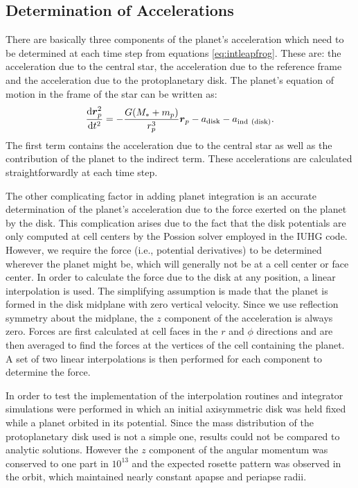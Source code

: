 \subsection{Determination of Accelerations}\label{sec:planetforces}

There are basically three components of the planet's acceleration which need to be determined at each time step from equations \eqref{eq:intleapfrog}. These are: the acceleration due to the central star, the acceleration due to the reference frame and the acceleration due to the protoplanetary disk. The planet's equation of motion in the frame of the star can be written as:
\begin{equation}
\frac{\mathrm{d} \boldsymbol{r}^2_p}{\mathrm{d} t^2} = -\frac{G(M_\ast + m_p)}{r^3_p}\boldsymbol{r}_p - a_{\mathrm{disk}} - a_{\mathrm{ind~(disk)}}.
\end{equation}
The first term contains the acceleration due to the central star as well as the contribution of the planet to the indirect term. These accelerations are calculated straightforwardly at each time step.

The other complicating factor in adding planet integration is an accurate determination of the planet's acceleration due to the force exerted on the planet by the disk. This complication arises due to the fact that the disk potentials are only computed at cell centers by the Possion solver employed in the IUHG code. However, we require the force (i.e., potential derivatives) to be determined wherever the planet might be, which will generally not be at a cell center or face center. In order to calculate the force due to the disk at any position, a linear interpolation is used. The simplifying assumption is made that the planet is formed in the disk midplane with zero vertical velocity. Since we use reflection symmetry about the midplane, the $z$ component of the acceleration is always zero. Forces are first calculated at cell faces in the $r$ and $\phi$ directions and are then averaged to find the forces at the vertices of the cell containing the planet. A set of two linear interpolations is then performed for each component to determine the force. 

In order to test the implementation of the interpolation routines and integrator simulations were performed in which an initial axisymmetric disk was held fixed while a planet orbited in its potential. Since the mass distribution of the protoplanetary disk used is not a simple one, results could not be compared to analytic solutions. However the $z$ component of the angular momentum was conserved to one part in $10^{13}$ and the expected rosette pattern was observed in the orbit, which maintained nearly constant apapse and periapse radii. 

